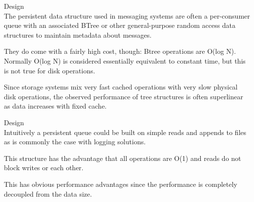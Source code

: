 \begin{frame}[plain,t]{Design} %
     \\
    \vspace{2ex}
    The persistent data structure used in messaging systems are often a per-consumer queue with an associated BTree or other general-purpose random access data structures to maintain metadata about messages.
    
    \vspace{2ex}
    They do come with a fairly high cost, though: Btree operations are O(log N). Normally O(log N) is considered essentially equivalent to constant time, but this is not true for disk operations. 
    
    \vspace{2ex}
    Since storage systems mix very fast cached operations with very slow physical disk operations, the observed performance of tree structures is often superlinear as data increases with fixed cache.
    
    
    
\end{frame}
\begin{frame}[plain,t]{Design} %
     \\
    \vspace{2ex}
    Intuitively a persistent queue could be built on simple reads and appends to files as is commonly the case with logging solutions. 
    
    \vspace{2ex}
    This structure has the advantage that all operations are O(1) and reads do not block writes or each other. 
    
    \vspace{2ex}
    This has obvious performance advantages since the performance is completely decoupled from the data size.
    
    
    
\end{frame}

